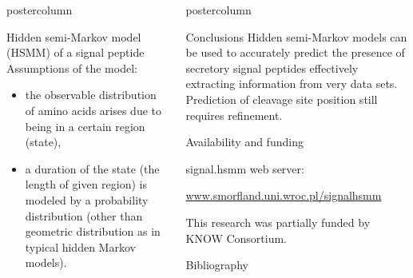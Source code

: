 \documentclass[final]{beamer}\usepackage[]{graphicx}\usepackage[]{color}
\newlength{\columnheight}
\begin{document}
\begin{frame}
\begin{columns}
\begin{column}{.46\textwidth}
\begin{beamercolorbox}[center,wd=\textwidth]{postercolumn}
\begin{minipage}[T]{.95\textwidth}
{    
    \begin{block}{Hidden semi-Markov model (HSMM) of a signal peptide}
      Assumptions of the model:
      \begin{itemize}
        \item the observable distribution of amino acids arises due to being in a certain region (state),
        \item a duration of the state (the length of given region) is modeled by a probability distribution (other than geometric distribution as in typical hidden Markov models).
      \end{itemize}
    \end{block}
    \vfill
            }
        \end{minipage}
      \end{beamercolorbox}
    \end{column}
    
    
    
    \begin{column}{.54\textwidth}
      \begin{beamercolorbox}[center,wd=\textwidth]{postercolumn}
        \begin{minipage}[T]{.95\textwidth}  
          \parbox[t][\columnheight]{\textwidth}
            {
     
    \begin{block}{Conclusions}
      Hidden semi-Markov models can be used to accurately predict the presence of secretory signal peptides effectively extracting information from very data sets. Prediction of cleavage site position still requires refinement.
    \end{block}
    \vfill 
    
        \begin{block}{Availability and funding}
        \footnotesize{
      signal.hsmm web server: 
      
      \url{www.smorfland.uni.wroc.pl/signalhsmm}
        }
        
        This research was partially funded by KNOW Consortium.
    \end{block}
    \vfill 
     
     
    \begin{block}{Bibliography}
    \tiny{
      
      
    }
    \end{block}
    \vfill
            }
        \end{minipage}
      \end{beamercolorbox}
    \end{column}
  \end{columns}  
\end{frame}
\end{document}
